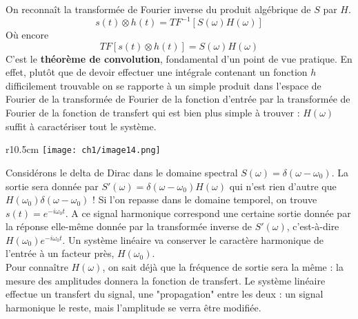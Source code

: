 On reconnaît la transformée de Fourier inverse du produit algébrique de $S$ par $H$.
\begin{equation}
s(t) \otimes h(t) = TF^{-1}[S(\omega)H(\omega)]
\end{equation}
Où encore
\begin{equation}
TF[s(t) \otimes h(t)] = S(\omega)H(\omega)
\end{equation}
C'est le \textbf{théorème de convolution}, fondamental d'un point de vue pratique. En 
effet, plutôt que de devoir effectuer une intégrale contenant un fonction $h$ difficilement 
trouvable on se rapporte à un simple produit dans l'espace de Fourier de la transformée de 
Fourier de la fonction d'entrée par la transformée de Fourier de la fonction de transfert 
qui est bien plus simple à trouver : $H(\omega)$ suffit à caractériser tout le système.\\

\begin{wrapfigure}[11]{r}{10.5cm}
\vspace{-6mm}
\texttt{[image: ch1/image14.png]}
\end{wrapfigure}
Considérons le delta de Dirac dans le domaine spectral $S(\omega) = \delta(\omega-\omega_0)$. 
La sortie sera donnée par $S'(\omega) = \delta(\omega-\omega_0)H(\omega)$ qui n'est rien 
d'autre que $H(\omega_0)\delta(\omega-\omega_0)$ ! Si l'on repasse dans le domaine temporel, 
on trouve $s(t) = e^{-i\omega_0t}$. A ce signal harmonique correspond une certaine sortie 
donnée par la réponse elle-même donnée par la transformée inverse de $S'(\omega)$, c'est-à-dire 
$H(\omega_0)e^{-i\omega_0t}$. Un système linéaire va conserver le caractère harmonique de 
l'entrée à un facteur près, $H(\omega_0)$.\\

Pour connaître $H(\omega)$, on sait déjà que la fréquence de sortie sera la même : la mesure 
des amplitudes donnera la fonction de transfert. Le système linéaire effectue un transfert 
du signal, une "propagation" entre les deux : un signal harmonique le reste, mais l'amplitude 
se verra être modifiée.\\


